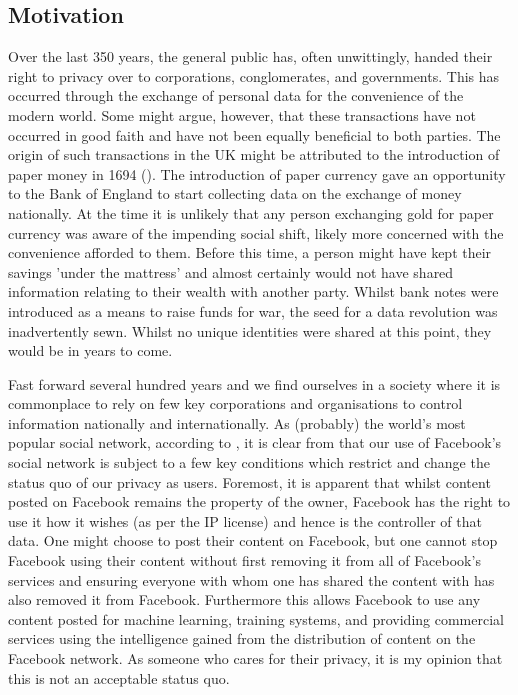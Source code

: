 \subsection{Motivation}

Over the last 350 years, the general public has, often unwittingly, handed their right to privacy over to corporations, conglomerates, and governments. This has occurred through the exchange of personal data for the convenience of the modern world. Some might argue, however, that these transactions have not occurred in good faith and have not been equally beneficial to both parties.
\newline
The origin of such transactions in the UK might be attributed to the introduction of paper money in 1694 (\cite{bankofengland:2016:online}). The introduction of paper currency gave an opportunity to the Bank of England to start collecting data on the exchange of money nationally. At the time it is unlikely that any person exchanging gold for paper currency was aware of the impending social shift, likely more concerned with the convenience afforded to them. Before this time, a person might have kept their savings 'under the mattress' and almost certainly would not have shared information relating to their wealth with another party. Whilst bank notes were introduced as a means to raise funds for war, the seed for a data revolution was inadvertently sewn. Whilst no unique identities were shared at this point, they would be in years to come.

Fast forward several hundred years and we find ourselves in a society where it is commonplace to rely on few key corporations and organisations to control information nationally and internationally. As (probably) the world's most popular social network, according to \cite{worldmapsocialnetworks:2017:online}, it is clear from \cite{facebookterms:2015:online} that our use of Facebook's social network is subject to a few key conditions which restrict and change the status quo of our privacy as users. Foremost, it is apparent that whilst content posted on Facebook remains the property of the owner, Facebook has the right to use it how it wishes (as per the IP license) and hence is the controller of that data. One might choose to post their content on Facebook, but one cannot stop Facebook using their content without first removing it from all of Facebook's services and ensuring everyone with whom one has shared the content with has also removed it from Facebook. Furthermore this allows Facebook to use any content posted for machine learning, training systems, and providing commercial services using the intelligence gained from the distribution of content on the Facebook network. As someone who cares for their privacy, it is my opinion that this is not an acceptable status quo.

